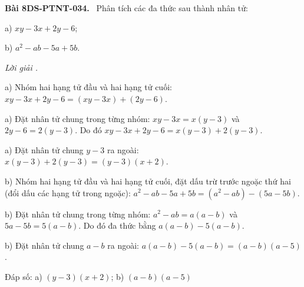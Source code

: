 \documentclass[12pt,a4paper]{article}
\newenvironment{problem}[1][]{\par\medskip\noindent\textbf{Bài #1.}\ }{\par}
\newenvironment{solution}[1][]{\par\noindent\textit{Lời giải #1.}\par}{\par}
\begin{document}
\begin{problem}[8DS-PTNT-034]
Phân tích các đa thức sau thành nhân tử:

a) $xy - 3x + 2y - 6$;

b) $a^2 - ab - 5a + 5b$.

\begin{solution}
a) Nhóm hai hạng tử đầu và hai hạng tử cuối: $xy - 3x + 2y - 6 = (xy - 3x) + (2y - 6)$.

a) Đặt nhân tử chung trong từng nhóm: $xy - 3x = x(y - 3)$ và $2y - 6 = 2(y - 3)$. Do đó $xy - 3x + 2y - 6 = x(y - 3) + 2(y - 3)$.

a) Đặt nhân tử chung $y - 3$ ra ngoài: $x(y - 3) + 2(y - 3) = (y - 3)(x + 2)$.

b) Nhóm hai hạng tử đầu và hai hạng tử cuối, đặt dấu trừ trước ngoặc thứ hai (đổi dấu các hạng tử trong ngoặc): $a^2 - ab - 5a + 5b = (a^2 - ab) - (5a - 5b)$.

b) Đặt nhân tử chung trong từng nhóm: $a^2 - ab = a(a - b)$ và $5a - 5b = 5(a - b)$. Do đó đa thức bằng $a(a - b) - 5(a - b)$.

b) Đặt nhân tử chung $a - b$ ra ngoài: $a(a - b) - 5(a - b) = (a - b)(a - 5)$.

Đáp số: a) $\boxed{(y - 3)(x + 2)}$; b) $\boxed{(a - b)(a - 5)}$
\end{solution}
\end{problem}
\end{document}
